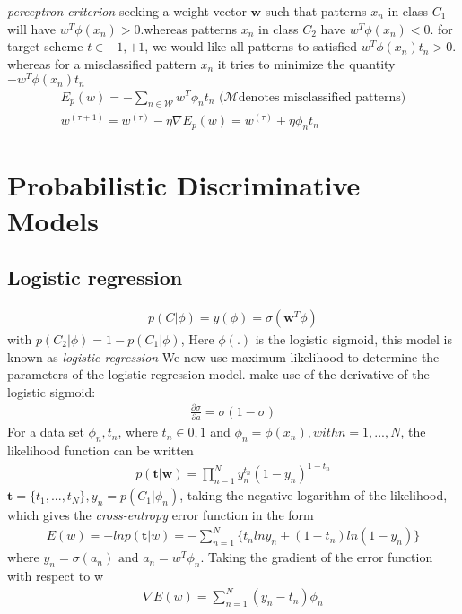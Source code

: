 \documentclass[a4paper]{article}
\begin{document}
\textit{perceptron criterion}
seeking a weight vector $\mathbf{w}$ such that patterns $x_n$ in class $C_1$
 will have $w^T \phi(x_n) > 0$.whereas patterns $x_n$ in class $C_2$
 have $w^T \phi(x_n) < 0$. for target scheme $t \in {-1, +1}$, we would like all
 patterns to satisfied $w^T \phi(x_n)t_n > 0$. whereas for a misclassified
 pattern $x_n$ it tries to minimize the quantity $ - w^T \phi(x_n)t_n$
\begin{align}
E_p(w) = - \sum_{n \in \mathcal{W}}w^T \phi_n t_n  \text{   ($\mathcal{M}$
  denotes misclassified patterns)}
\\
w^{(\tau+1)} = w^{(\tau)} - \eta \nabla E_p(w) = w^{(\tau)} + \eta
  \phi_n t_n
\end{align}

\section{Probabilistic Discriminative Models}

\subsection{Logistic regression}
\begin{align}
p(C|\phi) = y(\phi) = \sigma(\mathbf{w}^T \phi)
\end{align}
with $p(C_2|\phi) = 1 - p(C_1|\phi)$, Here $\phi(.)$ is the logistic sigmoid,
 this model is known as \textit{logistic regression}
We now use maximum likelihood to determine the parameters of the
 logistic regression model. make use of the derivative of the logistic sigmoid:
\begin{align}
\tfrac{\partial \sigma}{\partial a} = \sigma (1-\sigma)
\end{align}
For a data set ${\phi_n, t_n}$, where $t_n \in {0, 1}$ and $\phi_n = \phi(x_n),
with n = 1,...,N$, the likelihood function can be written
\begin{align}
p(\mathbf{t}|\mathbf{w}) = \displaystyle\prod_{n-1}^{N} y_n^{t_n}(1-y_n)^{1-t_n}
\end{align}
$\mathbf{t} = \{t_1,...,t_N\}, y_n = p(C_1|\phi_n)$,
taking the negative logarithm of the likelihood, which gives the
 \textit{cross-entropy} error function in the form
\begin{align}
E(w) = -ln \mathit{p} (\mathbf{t}|w) = - \displaystyle \sum_{n=1}^N \{
  \mathit{t_n}ln\mathit{y_n} + (1-\mathit{t_n})ln(1-\mathit{y_n}) \}
\end{align}
where $y_n = \sigma(a_n) \text{ and } a_n = w^T \phi_n$. Taking the gradient of
 the error function with respect to w
\begin{align}
\nabla E(w) = \displaystyle \sum_{n=1}^N (\mathit{y_n} -\mathit{t_n}) \phi_n
\end{align}
\end{document}
